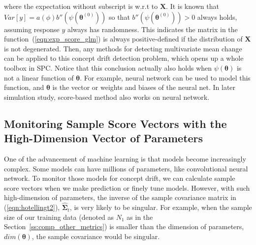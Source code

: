 \documentclass[twoside,11pt]{article}
\begin{document}
where the expectation without subscript is w.r.t to $\bm {X}$. It is known that $Var[y] = a ( \phi)b''(\psi ( \bm { \theta} ^{ (0)}))$ so that $b''(\psi ( \bm { \theta} ^{ (0)}))>0$ always holds, assuming response $y$ always has randomness. This indicates the matrix in the function~(\ref{eqn:exp_score_glm}) is always positive-defined if the distribution of $\bm {X}$ is not degenerated. Then, any methods for detecting multivariate mean change can be applied to this concept drift detection problem, which opens up a whole toolbox in SPC. Notice that this conclusion actually also holds when $ \psi ( \bm { \theta})$ is not a linear function of $\bm { \theta}$. For example, neural network can be used to model this function, and $\bm { \theta}$ is the vector or weights and biases of the neural net. In later simulation study, score-based method also works on neural network. 


\subsection{Monitoring Sample Score Vectors with the High-Dimension Vector of Parameters}
One of the advancement of machine learning is that models become increasingly complex. Some models can have millions of parameters, like convolutional neural network. To monitor those models for concept drift, we can calculate sample score vectors when we make prediction or finely tune models. However, with such high-dimension of parameters, the inverse of the sample covariance matrix in (\ref{eqn:hotellingt2}), $\hat {\bm { \Sigma}}_t$, is very likely to be singular. For example, when the sample size of our training data (denoted as $N_1$ as in the Section~\ref{ss:comp_other_metrics}) is smaller than the dimension of parameters, $dim(\bm { \theta})$, the sample covariance would be singular. 
\end{document}
